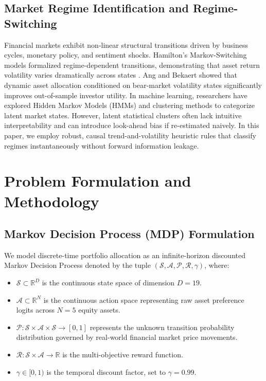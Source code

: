 \documentclass[conference]{IEEEtran}
\begin{document}
\subsection{Market Regime Identification and Regime-Switching}
Financial markets exhibit non-linear structural transitions driven by business cycles, monetary policy, and sentiment shocks. Hamilton's Markov-Switching models \cite{hamilton1989new} formalized regime-dependent transitions, demonstrating that asset return volatility varies dramatically across states \cite{guidolin2011markov}. Ang and Bekaert \cite{ang2002regime} showed that dynamic asset allocation conditioned on bear-market volatility states significantly improves out-of-sample investor utility. In machine learning, researchers have explored Hidden Markov Models (HMMs) and clustering methods \cite{kritzman2012regime} to categorize latent market states. However, latent statistical clusters often lack intuitive interpretability and can introduce look-ahead bias if re-estimated naively. In this paper, we employ robust, causal trend-and-volatility heuristic rules that classify regimes instantaneously without forward information leakage.

\section{Problem Formulation and Methodology}

\subsection{Markov Decision Process (MDP) Formulation}
We model discrete-time portfolio allocation as an infinite-horizon discounted Markov Decision Process denoted by the tuple $(\mathcal{S}, \mathcal{A}, \mathcal{P}, \mathcal{R}, \gamma)$, where:
\begin{itemize}
    \item $\mathcal{S} \subset \mathbb{R}^{D}$ is the continuous state space of dimension $D = 19$.
    \item $\mathcal{A} \subset \mathbb{R}^{N}$ is the continuous action space representing raw asset preference logits across $N = 5$ equity assets.
    \item $\mathcal{P}: \mathcal{S} \times \mathcal{A} \times \mathcal{S} \rightarrow [0, 1]$ represents the unknown transition probability distribution governed by real-world financial market price movements.
    \item $\mathcal{R}: \mathcal{S} \times \mathcal{A} \rightarrow \mathbb{R}$ is the multi-objective reward function.
    \item $\gamma \in [0, 1)$ is the temporal discount factor, set to $\gamma = 0.99$.
\end{itemize}
\end{document}
